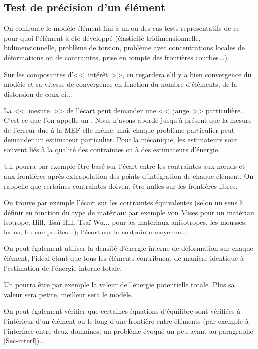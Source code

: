 \medskip
\subsection{Test de précision d'un élément}
On confronte le modèle élément fini à un ou des cas tests représentatifs de ce pour
quoi l'élément à été développé (élasticité tridimensionnelle,
bidimensionnelle, problème de torsion, problème avec concentrations locales de
déformations ou de contraintes, prise en compte des frontières courbes...).

Sur les composantes d'<<~intérêt~>>, on regardera s'il y a bien convergence
du modèle et sa vitesse de convergence en fonction du nombre d'éléments,
de la distorsion de ceux-ci...

\medskip
La <<~mesure~>> de l'écart peut demander une <<~jauge~>> particulière.
C'est ce que l'on appelle un .
Nous n'avons abordé jusqu'à présent que la mesure de l'erreur due à la
MEF elle-même, mais chaque problème particulier peut demander un
estimateur particulier.
Pour la mécanique, les estimateurs sont souvent liés à la qualité des
contraintes ou à des estimateurs d'énergie.

\medskip
Un  pourra par exemple être basé
sur l'écart entre les contraintes aux nœuds et aux frontières après
extrapolation des points d'intégration de chaque élément. On rappelle
que certaines contraintes doivent être nulles sur les frontières libres.

On trouve par exemple l'écart sur les contraintes équivalentes (selon un
sens à définir en fonction du type de matériau: par exemple von Mises
pour un matériau isotrope, Hill,
Tsaï-Hill,
Tsaï-Wu...
pour les matériaux anisotropes, les mousses, les os, les composites...);
l'écart sur la contrainte moyenne...

On peut également utiliser la densité d'énergie interne de
déformation sur chaque élément, l'idéal étant que tous les
éléments contribuent de manière identique à l'estimation de
l'énergie interne totale.

\medskip
Un  pourra être par exemple
la valeur de l'énergie potentielle totale. Plus sa valeur sera petite, meilleur
sera le modèle.

\medskip
On peut également vérifier que certaines équations d'équilibre sont vérifiées
à l'intérieur d'un élément ou le long d'une frontière entre éléments (par
exemple à l'interface entre deux domaines, un problème évoqué un peu avant
au paragraphe \ref{Sec-interf})...


\ifVersionAvecExemplesSepares\else
\fi
